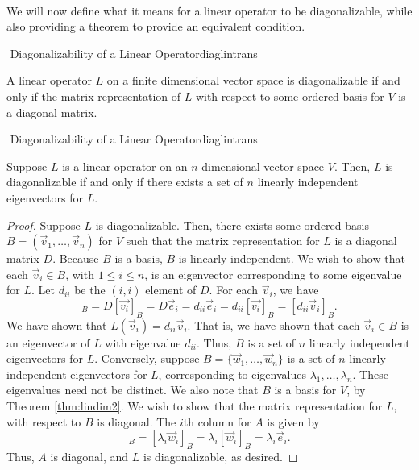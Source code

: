         \\
        We will now define what it means for a linear operator to be diagonalizable, while also providing a theorem to provide an equivalent condition.
        \begin{definition}{\Stop\,\,Diagonalizability of a Linear Operator}{diaglintrans}

            A linear operator \(L\) on a finite dimensional vector space is diagonalizable if and only if the matrix representation of \(L\) with respect to some ordered basis for \(V\) is a diagonal matrix.
            
        \end{definition}
        \pagebreak
        \begin{theorem}{\Stop\,\,Diagonalizability of a Linear Operator}{diaglintrans}

            Suppose \(L\) is a linear operator on an \(n\)-dimensional vector space \(V\). Then, \(L\) is diagonalizable if and only if there exists a set of \(n\) linearly independent eigenvectors for \(L\).
            \begin{proof}
                Suppose \(L\) is diagonalizable. Then, there exists some ordered basis \(B=(\vec{v}_1,\ldots,\vec{v}_n)\) for \(V\) such that the matrix representation for \(L\) is a diagonal matrix \(D\). Because \(B\) is a basis, \(B\) is linearly independent. We wish to show that each \(\vec{v}_i\in B\), with \(1\leq i\leq n\), is an eigenvector corresponding to some eigenvalue for \(L\). Let \(d_{ii}\) be the \((i,i)\) element of \(D\). For each \(\vec{v}_i\), we have
                \begin{equation*}
                    [L(\vec{v_i})]_B=D[\vec{v_i}]_B=D\vec{e}_i=d_{ii}\vec{e}_i=d_{ii}[\vec{v_i}]_B=[d_{ii}\vec{v}_i]_B.
                \end{equation*}
                We have shown that \(L(\vec{v}_i)=d_{ii}\vec{v}_i\). That is, we have shown that each \(\vec{v}_i\in B\) is an eigenvector of \(L\) with eigenvalue \(d_{ii}\). Thus, \(B\) is a set of \(n\) linearly independent eigenvectors for \(L\). Conversely, suppose \(B=\{\vec{w}_1,\ldots,\vec{w}_n\}\) is a set of \(n\) linearly independent eigenvectors for \(L\), corresponding to eigenvalues \(\lambda_1,\ldots,\lambda_n\). These eigenvalues need not be distinct. We also note that \(B\) is a basis for \(V\), by Theorem \ref{thm:lindim2}. We wish to show that the matrix representation for \(L\), with respect to \(B\) is diagonal. The \(i\)th column for \(A\) is given by
                \begin{equation*}
                    [L(\vec{w}_i)]_B=[\lambda_i\vec{w}_i]_B=\lambda_i[\vec{w}_i]_B=\lambda_i\vec{e}_i.
                \end{equation*}
                Thus, \(A\) is diagonal, and \(L\) is diagonalizable, as desired.
            \end{proof}
        \end{theorem}
